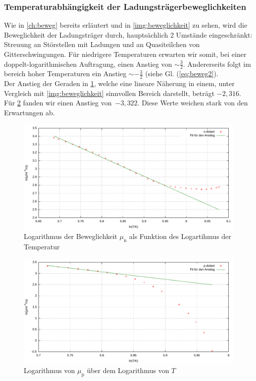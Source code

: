 \documentclass[numbers=noenddot,14pt,a4paper]{scrartcl}
\newcommand{\ix}[1]{_\text{#1}}
\begin{document}
\subsubsection{Temperaturabhängigkeit der Ladungsträgerbeweglichkeiten}
Wie in \ref{ch:beweg} bereits erläutert und in \ref{img:beweglichkeit} zu sehen, wird die Beweglichkeit der Ladungsträger durch, hauptsächlich 2 Umstände eingeschränkt: Streuung an Störstellen mit Ladungen und an Quasiteilchen von Gitterschwingungen. Für niedrigere Temperaturen erwarten wir somit, bei einer doppelt-logarithmischen Auftragung, einen Anstieg von $\sim\frac{3}{2}$. Andererseits folgt im bereich hoher Temperaturen ein Anstieg $\sim-\frac{3}{2}$ (siehe Gl. (\ref{eq:beweg2}).\\
Der Anstieg der Geraden in \ref{img:mu-n}, welche eine lineare Näherung in einem, unter Vergleich mit \ref{img:beweglichkeit} sinnvollen Bereich darstellt, beträgt $-2,316$. Für \ref{img:mu-p} fanden wir einen Anstieg \mbox{von $-3,322$.} Diese Werte weichen stark von den Erwartungen ab.
\begin{figure}[H]
	\includegraphics[width=\textwidth]{messwerte/beweglichkeitn.pdf}
	\caption{Logarithmus der Beweglichkeit $\mu\ix{n}$ als Funktion des Logartihmus der Temperatur} \label{img:mu-n}
\end{figure}
\begin{figure}[H]
	\includegraphics[width=\textwidth]{messwerte/beweglichkeitp.pdf}
	\caption{Logarithmus von $\mu\ix{p}$ über dem Logarithmus von $T$} \label{img:mu-p}
\end{figure}
\end{document}
